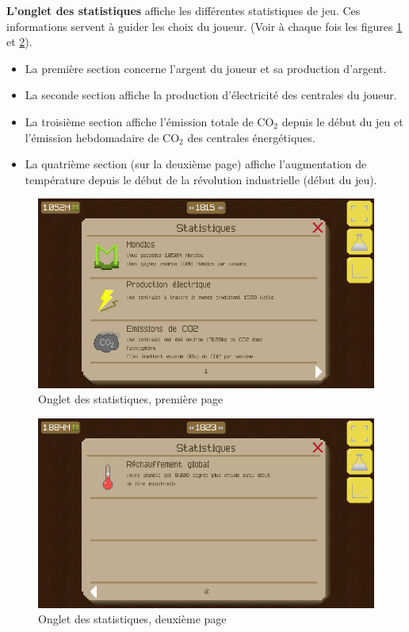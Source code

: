 \documentclass{article}
\begin{document}
        
        \textbf{L'onglet des statistiques} affiche les différentes statistiques de jeu. Ces informations servent à guider les choix du joueur. (Voir à chaque fois les figures \ref{fig:stats1} et \ref{fig:stats2}).
        \begin{itemize}
        		\item La première section concerne l'argent du joueur et sa production d'argent.
        		\item La seconde section affiche la production d'électricité des centrales du joueur.
        		\item La troisième section affiche l'émission totale de CO$_{2}$ depuis le début du jeu et l'émission hebdomadaire de CO$_{2}$ des centrales énergétiques.
        		\item La quatrième section (sur la deuxième page) affiche l'augmentation de température depuis le début de la révolution industrielle (début du jeu).
        \end{itemize}
        \begin{figure}[H]
                \includegraphics[width=\linewidth]{../images/stats1}
                \caption{Onglet des statistiques, première page}
                \label{fig:stats1}
        \end{figure}
        \begin{figure}[H]
                \includegraphics[width=\linewidth]{../images/stats2}
                \caption{Onglet des statistiques, deuxième page}
                \label{fig:stats2}
        \end{figure}
		
\end{document}
